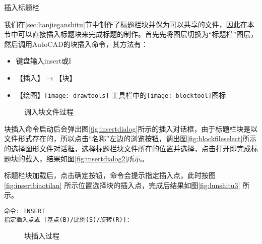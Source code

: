 \begin{procedure}
\item 插入标题栏

我们在\ref{sec:lianjieganshitu}节中制作了标题栏块并保为可以共享的文件，因此在本节中可以直接插入标题块来完成标题的制作。首先先将图层切换为“标题栏”图层，然后调用AutoCAD的块插入命令，其方法有：
\begin{itemize}
\item 键盘输入insert或I
\item 【插入】$\rightarrow $【块】
\item 【绘图】\texttt{[image: drawtools]} 工具栏中的\texttt{[image: blocktool]}图标
\end{itemize}

\begin{figure}[htbp]
\centering
{}\hspace{20pt}
\hspace{20pt}
\caption{调入块文件过程}
\end{figure}

块插入命令启动后会弹出图\ref{fig:insertdialog}所示的插入对话框，由于标题栏块是以文件形式存在的，所以点击“名称”左边的浏览按钮，调出图\ref{fig:blockfileselect}所示的选择图形文件对话框，选择标题栏块文件所在的位置并选择，点击打开即完成标题块的载入，结果如图\ref{fig:insertdialog2}所示。

标题栏块加载后，点击确定按钮，命令会提示指定插入点，此时按图\ref{fig:insertbiaotilan} 所示位置选择块的插入点，完成后结果如图\ref{fig:lunshitu3} 所示。
\begin{lstlisting}
命令: INSERT
指定插入点或 [基点(B)/比例(S)/旋转(R)]:
\end{lstlisting}

\begin{figure}[htbp]
\centering
{}\hspace{20pt}
\caption{块插入过程}
\end{figure}
\end{procedure}
